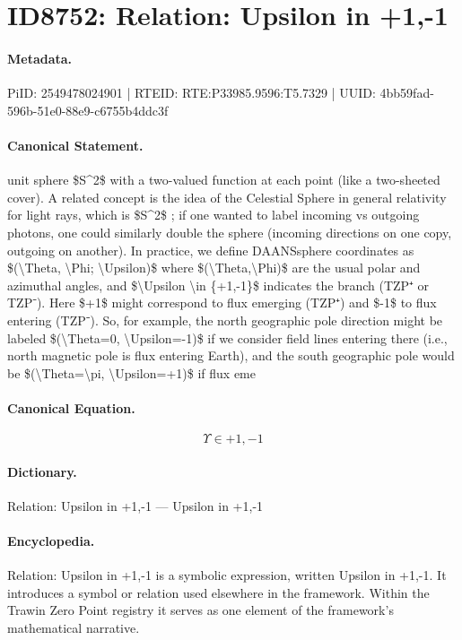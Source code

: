 \section*{ID8752: Relation: Upsilon in +1,-1}
\paragraph{Metadata.}
PiID: 2549478024901 | RTEID: RTE:P33985.9596:T5.7329 | UUID: 4bb59fad-596b-51e0-88e9-c6755b4ddc3f

\paragraph{Canonical Statement.}
unit sphere \$S\textasciicircum{}2\$ with a two-valued function at each point (like a two-sheeted cover). A related concept is the idea of the Celestial Sphere in general relativity for light rays, which is \$S\textasciicircum{}2\$ ; if one wanted to label incoming vs outgoing photons, one could similarly double the sphere (incoming directions on one copy, outgoing on another). In practice, we define DAANSsphere coordinates as \$(\textbackslash{}Theta, \textbackslash{}Phi; \textbackslash{}Upsilon)\$ where \$(\textbackslash{}Theta,\textbackslash{}Phi)\$ are the usual polar and azimuthal angles, and \$\textbackslash{}Upsilon \textbackslash{}in \{+1,-1\}\$ indicates the branch (TZP⁺ or TZP⁻). Here \$+1\$ might correspond to flux emerging (TZP⁺) and \$-1\$ to flux entering (TZP⁻). So, for example, the north geographic pole direction might be labeled \$(\textbackslash{}Theta=0, \textbackslash{}Upsilon=-1)\$ if we consider field lines entering there (i.e., north magnetic pole is flux entering Earth), and the south geographic pole would be \$(\textbackslash{}Theta=\textbackslash{}pi, \textbackslash{}Upsilon=+1)\$ if flux eme

\paragraph{Canonical Equation.}
\[
\Upsilon \in {+1,-1}
\]

\paragraph{Dictionary.}
Relation: Upsilon in +1,-1 — Upsilon in +1,-1

\paragraph{Encyclopedia.}
Relation: Upsilon in +1,-1 is a symbolic expression, written Upsilon in +1,-1. It introduces a symbol or relation used elsewhere in the framework. Within the Trawin Zero Point registry it serves as one element of the framework's mathematical narrative.
